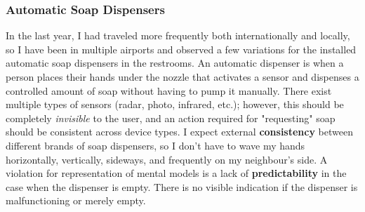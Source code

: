 \documentclass[12pt,letterpaper]{article}
\begin{document}
\subsubsection*{Automatic Soap Dispensers}
In the last year, I had traveled more frequently both internationally and locally, so I have been in multiple airports and observed a few variations for the installed automatic soap dispensers in the restrooms. An automatic dispenser is when a person places their hands under the nozzle that activates a sensor and dispenses a controlled amount of soap without having to pump it manually. There exist multiple types of sensors (radar, photo, infrared, etc.); however, this should be completely  \textit{invisible} to the user, and an action required for "requesting" soap should be consistent across device types. I expect external \textbf{consistency} between different brands of soap dispensers, so I don't have to wave my hands horizontally, vertically, sideways, and frequently on my neighbour's side. A violation for representation of mental models is a lack of \textbf{predictability} in the case when the dispenser is empty. There is no visible indication if the dispenser is malfunctioning or merely empty. 

 

\end{document}
